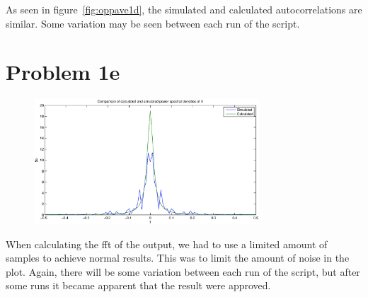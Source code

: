 	As seen in figure~\ref{fig:oppave1d}, the simulated and calculated autocorrelations are similar. Some variation may be seen between each run of the script. 
  
  \section{Problem 1e}
	
	\begin{figure}[h]
	  \centering
	  \includegraphics[width=0.75\textwidth]{img/Oppgave1e}
	\end{figure}
	
	When calculating the fft of the output, we had to use a limited amount of samples to achieve normal results. This was to limit the amount of noise in the plot.
	Again, there will be some variation between each run of the script, but after some runs it became apparent that the result were approved.
